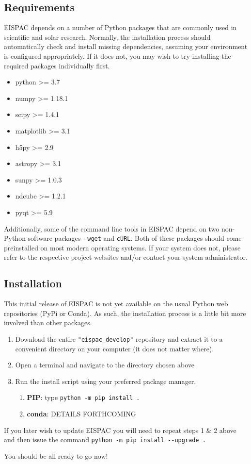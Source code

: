 \subsection{Requirements}
EISPAC depends on a number of Python packages that are commonly used in scientific and solar research.
Normally, the installation process should automatically check and install missing dependencies,
assuming your environment is configured appropriately. If it does not, you may wish to try installing
the required packages individually first.
\begin{itemize}
    \item python >= 3.7
    \item numpy >= 1.18.1
    \item scipy >= 1.4.1
    \item matplotlib >= 3.1
    \item h5py >= 2.9
    \item astropy >= 3.1
    \item sunpy >= 1.0.3
    \item ndcube >= 1.2.1
    \item pyqt >= 5.9
\end{itemize}
Additionally, some of the command line tools in EISPAC depend on two non-Python software packages -
\verb+wget+ and \verb+cURL+. Both of these packages should come preinstalled on most modern operating
systems. If your system does not, please refer to the respective project websites and/or contact your system administrator.

\subsection{Installation}
This initial release of EISPAC is not yet available on the usual Python web repositories (PyPi or
Conda). As such, the installation process is a little bit more involved than other packages.
\begin{enumerate}
    \item Download the entire \verb+"eispac_develop"+ repository and extract it to a convenient directory on your computer (it does not matter where).
    \item Open a terminal and navigate to the directory chosen above
    \item Run the install script using your preferred package manager,
        \begin{enumerate}
            \item \textbf{PIP}: type \verb+python -m pip install .+
            \item \textbf{conda}: DETAILS FORTHCOMING
        \end{enumerate}
\end{enumerate}
If you later wish to update EISPAC you will need to repeat steps 1 \& 2 above and then issue the command \verb+python -m pip install --upgrade .+

You should be all ready to go now!
